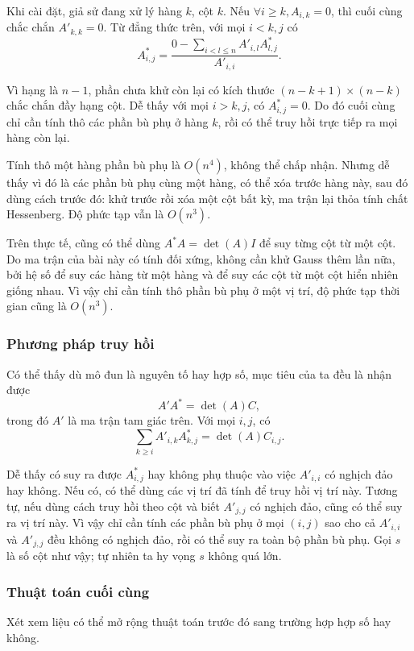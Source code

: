 \documentclass[11pt]{article}
\begin{document}
Khi cài đặt, giả sử đang xử lý hàng \(k\), cột \(k\). Nếu
\(\forall i\ge k, A_{i,k}=0\), thì cuối cùng chắc chắn \(A'_{k,k}=0\). Từ đẳng
thức trên, với mọi \(i<k,j\) có
\[
  A^\ast_{i,j}=
  \frac{0-\sum_{i<l\le n} A'_{i,l}A^\ast_{l,j}}{A'_{i,i}}.
\]

Vì hạng là \(n-1\), phần chưa khử còn lại có kích thước
\((n-k+1)\times(n-k)\) chắc chắn đầy hạng cột. Dễ thấy với mọi \(i>k,j\), có
\(A^\ast_{i,j}=0\). Do đó cuối cùng chỉ cần tính thô các phần bù phụ ở hàng
\(k\), rồi có thể truy hồi trực tiếp ra mọi hàng còn lại.

Tính thô một hàng phần bù phụ là \(O(n^4)\), không thể chấp nhận. Nhưng dễ thấy
vì đó là các phần bù phụ cùng một hàng, có thể xóa trước hàng này, sau đó dùng
cách trước đó: khử trước rồi xóa một cột bất kỳ, ma trận lại thỏa tính chất
Hessenberg. Độ phức tạp vẫn là \(O(n^3)\).

Trên thực tế, cũng có thể dùng \(A^\ast A=\det(A)I\) để suy từng cột từ một cột.
Do ma trận của bài này có tính đối xứng, không cần khử Gauss thêm lần nữa, bởi
hệ số để suy các hàng từ một hàng và để suy các cột từ một cột hiển nhiên giống
nhau. Vì vậy chỉ cần tính thô phần bù phụ ở một vị trí, độ phức tạp thời gian
cũng là \(O(n^3)\).

\subsubsection{Phương pháp truy hồi}

Có thể thấy dù mô đun là nguyên tố hay hợp số, mục tiêu của ta đều là nhận được
\[
  A'A^\ast=\det(A)C,
\]
trong đó \(A'\) là ma trận tam giác trên. Với mọi \(i,j\), có
\[
  \sum_{k\ge i} A'_{i,k}A^\ast_{k,j}=\det(A)C_{i,j}.
\]

Dễ thấy có suy ra được \(A^\ast_{i,j}\) hay không phụ thuộc vào việc
\(A'_{i,i}\) có nghịch đảo hay không. Nếu có, có thể dùng các vị trí đã tính để
truy hồi vị trí này. Tương tự, nếu dùng cách truy hồi theo cột và biết
\(A'_{j,j}\) có nghịch đảo, cũng có thể suy ra vị trí này. Vì vậy chỉ cần tính
các phần bù phụ ở mọi \((i,j)\) sao cho cả \(A'_{i,i}\) và \(A'_{j,j}\) đều
không có nghịch đảo, rồi có thể suy ra toàn bộ phần bù phụ. Gọi \(s\) là số cột
như vậy; tự nhiên ta hy vọng \(s\) không quá lớn.

\subsubsection{Thuật toán cuối cùng}

Xét xem liệu có thể mở rộng thuật toán trước đó sang trường hợp hợp số hay
không.
\end{document}
